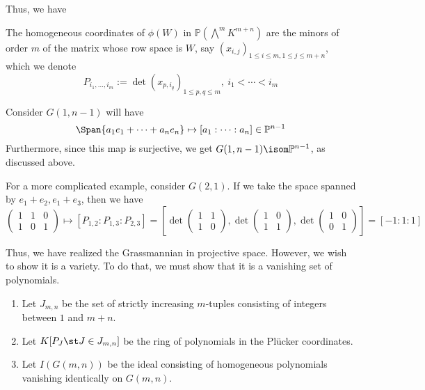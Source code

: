 \documentclass[11pt,leqno,oneside]{amsart}
\numberwithin{thm}{section}
\renewcommand{\P}{\mathbb{P}}
\newcommand{\ExtP}{\bigwedge}
\begin{document}
Thus, we have
\begin{thm}
  The homogeneous coordinates of \(\phi(W)\) in \(\P(\ExtP^m
  K^{m+n})\) are the minors of order \(m\) of the matrix whose row
  space is \(W\), say \((x_{i,j})_{1 \leq i \leq m, 1 \leq j \leq
    m+n}\), which we denote \[
    P_{i_1, \ldots, i_m} := \det(x_{p,i_q})_{1
      \leq p,q \leq m}, \ i_1 
    < \cdots < i_m
  \]
\end{thm}
\begin{example}
  Consider \(G(1,n-1)\) will have \[
    \Span\{a_1 e_1 + \cdots + a_n e_n\} \mapsto [a_1: \cdots :a_n] \in
    \P^{n-1} 
  \]
  Furthermore, since this map is surjective, we get \(G(1,n-1) \isom
  \P^{n-1}\), as discussed above.

  For a more complicated example, consider \(G(2,1)\). If we take the
  space spanned by \(e_1+e_2,e_1+e_3\), then we have \[
    \left(
      \begin{array}{ccc}
        1&1&0\\
        1&0&1
      \end{array}
\right) \mapsto [P_{1,2}:P_{1,3}:P_{2,3}] = \left[ \det \left(
    \begin{array}{cc}
      1&1\\
      1&0
    \end{array}
\right), \det \left(
  \begin{array}{cc}
    1&0\\
    1&1
  \end{array}
\right), \det \left(
  \begin{array}{cc}
    1&0\\
    0&1
  \end{array}
\right) \right] = [-1:1:1]
  \]
  
\end{example}
Thus, we have realized the Grassmannian in projective
space. However, we wish to show it is a variety. To do that, we must
show that it is a vanishing set of polynomials.
\begin{defn}
  \begin{enumerate}
  \item Let \(J_{m,n}\) be the set of strictly increasing \(m\)-tuples
  consisting of integers between \(1\) and \(m+n\).
  \item Let \(K[P_J \st J \in J_{m,n}]\) be the ring of polynomials in
    the Pl\"{u}cker coordinates.
  \item Let \(I(G(m,n))\) be the ideal consisting of homogeneous
    polynomials vanishing identically on \(G(m,n)\). 
  \end{enumerate}
\end{defn}
\end{document}
